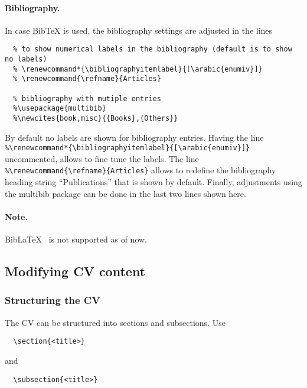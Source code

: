 \documentclass[a4paper,11pt]{article}
\newcommand{\biblatex}{BibLaTeX}
\begin{document}
\paragraph{Bibliography.}
In case BibTeX is used, the bibliography settings are adjusted in the lines 
\begin{lstlisting}
  % to show numerical labels in the bibliography (default is to show no labels)
  % \renewcommand*{\bibliographyitemlabel}{[\arabic{enumiv}]}
  % \renewcommand{\refname}{Articles}

  % bibliography with mutiple entries
  %\usepackage{multibib}
  %\newcites{book,misc}{{Books},{Others}}
\end{lstlisting}
By default no labels are shown for bibliography entries. 
Having the line 
\lstinline!%\renewcommand*{\bibliographyitemlabel}{[\arabic{enumiv}]}! uncommented, 
allows to fine tune the labels. 
The line \lstinline!%\renewcommand{\refname}{Articles}! allows to redefine the bibliography heading string ``Publications'' that is shown by default. 
Finally, adjustments using the multibib package can be done in the last two lines shown here. 

\paragraph{Note.} \biblatex~ is not supported as of now.

\subsection{Modifying CV content}
\subsubsection{Structuring the CV}
The CV can be structured into sections and subsections. Use

\begin{lstlisting}
  \section{<title>}
\end{lstlisting}

and 

\begin{lstlisting}
  \subsection{<title>}
\end{lstlisting}
\end{document}
